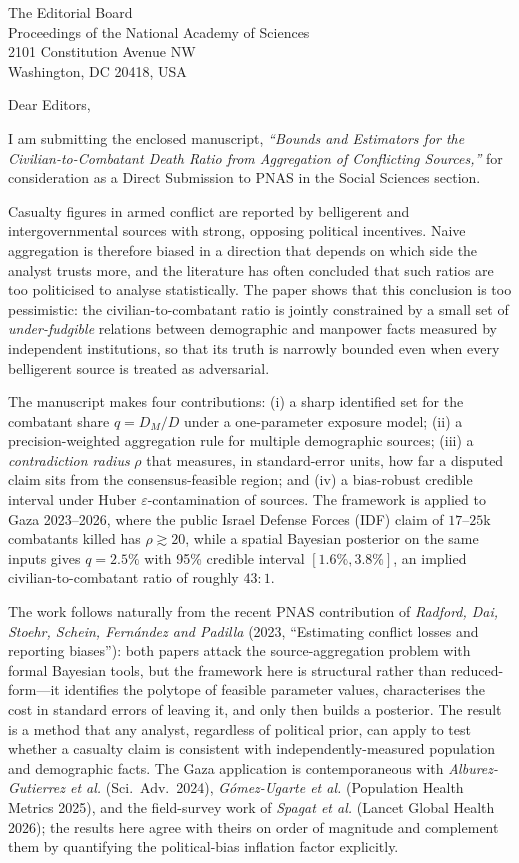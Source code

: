 \documentclass[11pt]{letter}
\begin{document}
\begin{letter}{The Editorial Board\\ Proceedings of the National Academy of Sciences\\ 2101 Constitution Avenue NW\\ Washington, DC 20418, USA}

\opening{Dear Editors,}

I am submitting the enclosed manuscript, \emph{``Bounds and Estimators for the Civilian-to-Combatant Death Ratio from Aggregation of Conflicting Sources,''} for consideration as a Direct Submission to PNAS in the Social Sciences section.

Casualty figures in armed conflict are reported by belligerent and intergovernmental sources with strong, opposing political incentives. Naive aggregation is therefore biased in a direction that depends on which side the analyst trusts more, and the literature has often concluded that such ratios are too politicised to analyse statistically. The paper shows that this conclusion is too pessimistic: the civilian-to-combatant ratio is jointly constrained by a small set of \emph{under-fudgible} relations between demographic and manpower facts measured by independent institutions, so that its truth is narrowly bounded even when every belligerent source is treated as adversarial.

The manuscript makes four contributions: (i) a sharp identified set for the combatant share $q=D_M/D$ under a one-parameter exposure model; (ii) a precision-weighted aggregation rule for multiple demographic sources; (iii) a \emph{contradiction radius} $\rho$ that measures, in standard-error units, how far a disputed claim sits from the consensus-feasible region; and (iv) a bias-robust credible interval under Huber $\varepsilon$-contamination of sources. The framework is applied to Gaza 2023--2026, where the public Israel Defense Forces (IDF) claim of $17$--$25$k combatants killed has $\rho\gtrsim 20$, while a spatial Bayesian posterior on the same inputs gives $q=2.5\%$ with 95\% credible interval $[1.6\%,3.8\%]$, an implied civilian-to-combatant ratio of roughly $43{:}1$.

The work follows naturally from the recent PNAS contribution of \emph{Radford, Dai, Stoehr, Schein, Fern\'{a}ndez and Padilla} (2023, ``Estimating conflict losses and reporting biases''): both papers attack the source-aggregation problem with formal Bayesian tools, but the framework here is structural rather than reduced-form---it identifies the polytope of feasible parameter values, characterises the cost in standard errors of leaving it, and only then builds a posterior. The result is a method that any analyst, regardless of political prior, can apply to test whether a casualty claim is consistent with independently-measured population and demographic facts. The Gaza application is contemporaneous with \emph{Alburez-Gutierrez et al.} (Sci.~Adv.~2024), \emph{G\'{o}mez-Ugarte et al.} (Population Health Metrics 2025), and the field-survey work of \emph{Spagat et al.} (Lancet Global Health 2026); the results here agree with theirs on order of magnitude and complement them by quantifying the political-bias inflation factor explicitly.


\end{letter}
\end{document}
